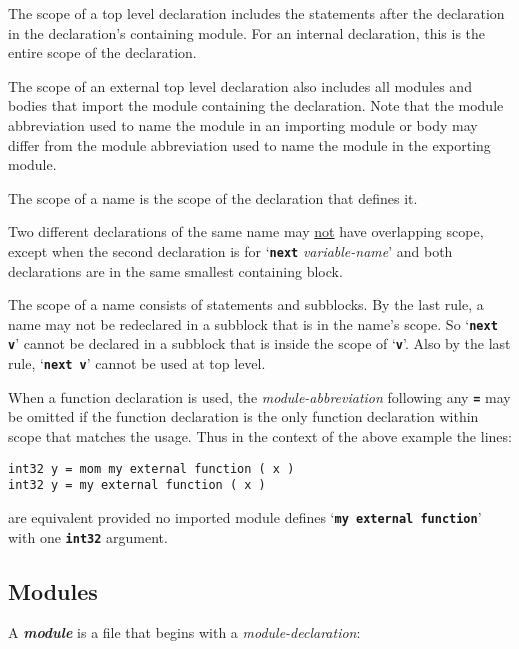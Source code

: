 \documentclass[12pt]{article}
\newcommand{\TT}[1]{{\tt \bfseries #1}}
\newcommand{\key}[1]{{\bf \em #1}\index{#1}}
\newenvironment{indpar}[1][0.3in]%
	{\begin{list}{}%
		     {\setlength{\itemsep}{0in}%
		      \setlength{\topsep}{0in}%
		      \setlength{\parsep}{1ex}%
		      \setlength{\labelwidth}{#1}%
		      \setlength{\leftmargin}{#1}%
		      \addtolength{\leftmargin}{\labelsep}}%
	 \item}%
	{\end{list}}
\begin{document}
The scope of a top level declaration includes the statements
after the declaration in the declaration's containing module.
For an internal declaration, this is the entire scope of
the declaration.

The scope of an external top level declaration also includes
all modules and bodies that import the module containing the declaration.
Note that the module abbreviation used to name the
module in an importing module or body
may differ from the module abbreviation
used to name the module in the exporting module.

The scope of a name is the scope of the declaration that defines
it.

Two different declarations of the same name may \underline{not}
have overlapping scope, except when the second declaration is
for `\TT{next} {\em variable-name}' and both declarations are
in the same smallest containing block.

The scope of a name consists of statements and subblocks.
By the last rule, a name may not be
redeclared in a subblock that is in the name's scope.
So `\TT{next v}' cannot be declared in a subblock that is inside the scope
of `\TT{v}'.  Also by the last rule, `\TT{next v}' cannot be used
at top level.

When a function declaration is used, the {\em module-abbreviation}
following any \TT{=} may be omitted if the function declaration is
the only function declaration within scope that matches the usage.
Thus in the context of the above example the lines:
\begin{indpar}\begin{verbatim}
int32 y = mom my external function ( x )
int32 y = my external function ( x )
\end{verbatim}\end{indpar}
are equivalent provided no imported module defines `\TT{my external function}'
with one \TT{int32} argument.

\subsection{Modules}
\label{MODULES}

A \key{module} is a file that begins with a {\em module-declaration}:
\end{document}
